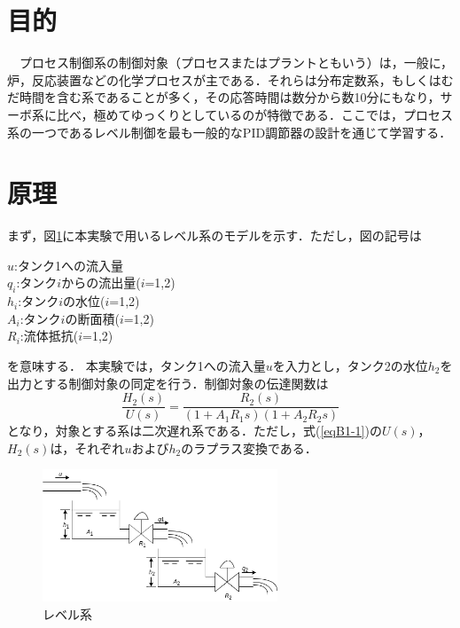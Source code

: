 \documentclass[12pt]{jsarticle}
\begin{document}
\section{目的}
　プロセス制御系の制御対象（プロセスまたはプラントともいう）は，一般に，炉，反応装置などの化学プロセスが主である．それらは分布定数系，もしくはむだ時間を含む系であることが多く，その応答時間は数分から数10分にもなり，サーボ系に比べ，極めてゆっくりとしているのが特徴である．ここでは，プロセス系の一つであるレベル制御を最も一般的なPID調節器の設計を通じて学習する．
\section{原理}
まず，図\ref{FigB1-1}に本実験で用いるレベル系のモデルを示す．ただし，図の記号は
\begin{flushleft}
  \setlength{\leftskip}{3.0cm}
     $u$:タンク1への流入量\\
     $q_i$:タンク$i$からの流出量($i$=1,2)\\
     $h_i$:タンク$i$の水位($i$=1,2)\\
     $A_i$:タンク$i$の断面積($i$=1,2)\\
     $R_i$:流体抵抗($i$=1,2)
\end{flushleft}
を意味する．
本実験では，タンク1への流入量$u$を入力とし，タンク2の水位$h_2$を出力とする制御対象の同定を行う．制御対象の伝達関数は
\begin{equation}
  \label{eqB1-1}
  \frac{H_2(s)}{U(s)} = \frac{R_2(s)}{(1+A_1R_1s)(1+A_2R_2s)}
\end{equation}
となり，対象とする系は二次遅れ系である．ただし，式(\ref{eqB1-1})の$U(s)$，$H_2(s)$は，それぞれ$u$および$h_2$のラプラス変換である．

\begin{figure}[H]
  \begin{center}
    \includegraphics[clip,width=7.0cm]{../img/FigB1_1.png}
    \caption{レベル系}
    \label{FigB1-1}
  \end{center}
\end{figure}
\end{document}
